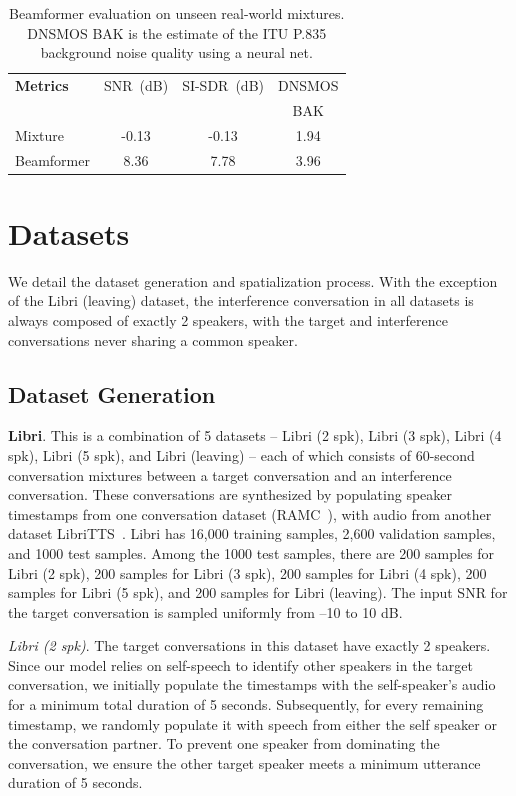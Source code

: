 \begin{table}[t!]
\caption{Beamformer evaluation on unseen real-world mixtures. DNSMOS BAK is the estimate of the ITU P.835 background noise quality using a  neural net.}
\vskip -0.1in
\centering
{\footnotesize
\begin{tabular}{lccc}
\toprule
\textbf{Metrics} & SNR~(dB) & SI-SDR~(dB) & DNSMOS  \\
 &  & & BAK  \\
\midrule
    Mixture & -0.13 & -0.13 & 1.94 \\
    Beamformer & 8.36 & 7.78 & 3.96 \\
\bottomrule
\end{tabular}
}
\label{tab:bf_eval}
\vskip -0.15in
\end{table}



\section{Datasets}
We detail the dataset generation and spatialization process. With the exception of the Libri (leaving) dataset, the interference conversation in all datasets is always composed of exactly 2 speakers, with the target and interference conversations never sharing a common speaker.


\subsection{Dataset Generation}\label{sec:datasetgen}
\textbf{Libri}. This is a combination of 5 datasets -- Libri (2 spk), Libri (3 spk), {Libri (4 spk), Libri (5 spk), and} Libri (leaving) -- each of which consists of 60-second conversation mixtures between a target conversation and an interference conversation. These conversations are synthesized by populating speaker timestamps from one conversation dataset (RAMC~\cite{ramc}), with audio from another dataset LibriTTS~\cite{zen2019libritts}. Libri has 16,000 training samples, 2,600 validation samples, and {1000} test samples. Among the 1000 test samples, there are 200 samples for Libri (2 spk), 200 samples for Libri (3 spk), 200 samples for Libri (4 spk), 200 samples for Libri (5 spk), and 200 samples for Libri (leaving). The input SNR for the target conversation is sampled uniformly from –10 to 10 dB.

\textit{Libri (2 spk)}. The target conversations in this dataset have exactly 2 speakers. Since our model relies on self-speech to identify other speakers in the target conversation, we initially populate the timestamps with the self-speaker's audio for a minimum total duration of 5 seconds. Subsequently, for every remaining timestamp, we randomly populate it with speech from either the self speaker or the conversation partner. To prevent one speaker from dominating the conversation, we ensure the other target speaker meets a minimum utterance duration of 5 seconds. 

